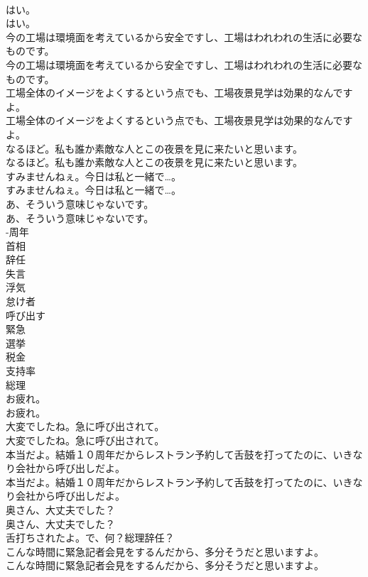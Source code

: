 \documentclass[8pt]{extreport}
\begin{document}
\begin{CJK}{UTF8}{min}
\\	はい。	
\\	はい。 
\\	今の工場は環境面を考えているから安全ですし、工場はわれわれの生活に必要なものです。	
\\	今の工場は環境面を考えているから安全ですし、工場はわれわれの生活に必要なものです。 
\\	工場全体のイメージをよくするという点でも、工場夜景見学は効果的なんですよ。	
\\	工場全体のイメージをよくするという点でも、工場夜景見学は効果的なんですよ。 
\\	なるほど。私も誰か素敵な人とこの夜景を見に来たいと思います。	
\\	なるほど。私も誰か素敵な人とこの夜景を見に来たいと思います。 
\\	すみませんねぇ。今日は私と一緒で…。	
\\	すみませんねぇ。今日は私と一緒で…。 
\\	あ、そういう意味じゃないです。	
\\	あ、そういう意味じゃないです。 
\\	-周年
\\	首相
\\	辞任
\\	失言
\\	浮気
\\	怠け者
\\	呼び出す
\\	緊急
\\	選挙
\\	税金
\\	支持率
\\	総理
\\	お疲れ。	
\\	お疲れ。 
\\	大変でしたね。急に呼び出されて。	
\\	大変でしたね。急に呼び出されて。 
\\	本当だよ。結婚１０周年だからレストラン予約して舌鼓を打ってたのに、いきなり会社から呼び出しだよ。	
\\	本当だよ。結婚１０周年だからレストラン予約して舌鼓を打ってたのに、いきなり会社から呼び出しだよ。 
\\	奥さん、大丈夫でした？	
\\	奥さん、大丈夫でした？ 
\\	舌打ちされたよ。で、何？総理辞任？	
\\	こんな時間に緊急記者会見をするんだから、多分そうだと思いますよ。	
\\	こんな時間に緊急記者会見をするんだから、多分そうだと思いますよ。 

\end{CJK}
\end{document}

